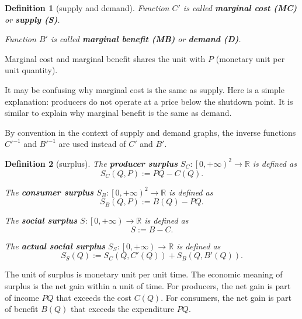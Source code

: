 \documentclass{article}
\newtheorem{definition}{Definition}
\begin{document}
\begin{definition}[supply and demand]
Function $C'$ is called \textbf{marginal cost (MC)} or \textbf{supply (S)}.

Function $B'$ is called \textbf{marginal benefit (MB)} or \textbf{demand (D)}.
\end{definition}

Marginal cost and marginal benefit shares the unit with $P$
(monetary unit per unit quantity).

It may be confusing why marginal cost is the same as supply.
Here is a simple explanation: producers do not operate at a price below the shutdown point.
It is similar to explain why marginal benefit is the same as demand.

By convention in the context of supply and demand graphs, the inverse functions $C'^{-1}$ and $B'^{-1}$ are used instead of $C'$ and $B'$.

\begin{definition}[surplus]
\label{surplus}
The \textbf{producer surplus} $S_C:\left[0,+\infty\right)^2\to\mathbb R$ is defined as
$$S_C\left(Q,P\right):=PQ-C\left(Q\right).$$

The \textbf{consumer surplus} $S_B:\left[0,+\infty\right)^2\to\mathbb R$ is defined as
$$S_B\left(Q,P\right):=B\left(Q\right)-PQ.$$

The \textbf{social surplus} $S:\left[0,+\infty\right)\to\mathbb R$ is defined as
$$S:=B-C.$$

The \textbf{actual social surplus} $S_S:\left[0,+\infty\right)\to\mathbb R$ is defined as
$$S_S\left(Q\right):=S_C\left(Q,C'\left(Q\right)\right)+S_B\left(Q,B'\left(Q\right)\right).$$
\end{definition}

The unit of surplus is monetary unit per unit time.
The economic meaning of surplus is the net gain within a unit of time.
For producers, the net gain is part of income $PQ$ that exceeds the cost $C\left(Q\right)$.
For consumers, the net gain is part of benefit $B\left(Q\right)$ that exceeds the expenditure $PQ$.
\end{document}
